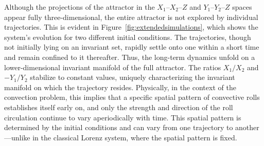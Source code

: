 \documentclass[paper=a4, fontsize=11pt]{scrartcl}
\numberwithin{equation}{section}		%
\numberwithin{figure}{section}			%
\numberwithin{table}{section}				%
\begin{document}
Although the projections of the attractor in the \( X_1\text{--}X_2\text{--}Z \) and \( Y_1\text{--}Y_2\text{--}Z \) spaces appear fully three-dimensional, the entire attractor is not explored by individual trajectories. This is evident in Figure~\ref{fig:extendedsimulations}, which shows the system’s evolution for two different initial conditions. The trajectories, though not initially lying on an invariant set, rapidly settle onto one within a short time and remain confined to it thereafter. Thus, the long-term dynamics unfold on a lower-dimensional invariant manifold of the full attractor. The ratios \( X_1/X_2 \) and \( -Y_1/Y_2 \) stabilize to constant values, uniquely characterizing the invariant manifold on which the trajectory resides. Physically, in the context of the convection problem, this implies that a specific spatial pattern of convective rolls establishes itself early on, and only the strength and direction of the roll circulation continue to vary aperiodically with time. This spatial pattern is determined by the initial conditions and can vary from one trajectory to another—unlike in the classical Lorenz system, where the spatial pattern is fixed.
\end{document}
